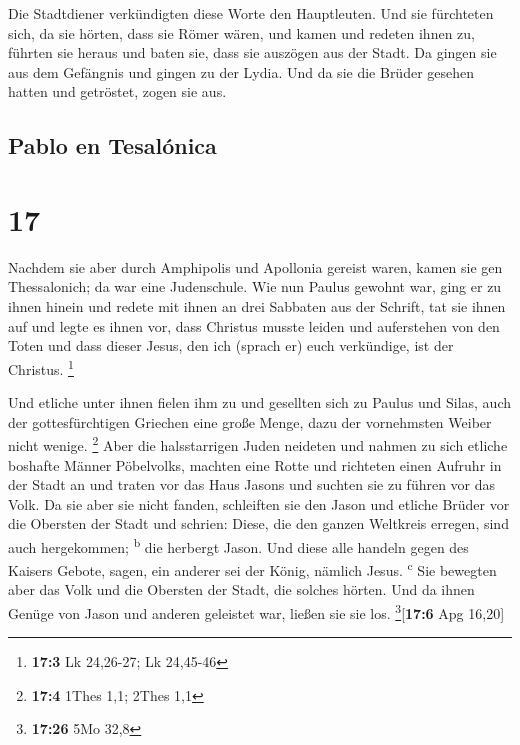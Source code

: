  Die Stadtdiener verkündigten diese Worte den
Hauptleuten. Und sie fürchteten sich, da sie hörten, dass sie Römer
wären,  und kamen und redeten ihnen zu, führten sie
heraus und baten sie, dass sie auszögen aus der Stadt. 
Da gingen sie aus dem Gefängnis und gingen zu der Lydia. Und da sie die
Brüder gesehen hatten und getröstet, zogen sie aus.

\hypertarget{pablo-en-tesaluxf3nica}{%
\subsection{Pablo en Tesalónica}\label{pablo-en-tesaluxf3nica}}

\hypertarget{section-16}{%
\section{17}\label{section-16}}

 Nachdem sie aber durch Amphipolis und Apollonia gereist
waren, kamen sie gen Thessalonich; da war eine Judenschule.
 Wie nun Paulus gewohnt war, ging er zu ihnen hinein und
redete mit ihnen an drei Sabbaten aus der Schrift,  tat
sie ihnen auf und legte es ihnen vor, dass Christus musste leiden und
auferstehen von den Toten und dass dieser Jesus, den ich (sprach er)
euch verkündige, ist der Christus. \footnote{\textbf{17:3} Lk 24,26-27;
  Lk 24,45-46}

 Und etliche unter ihnen fielen ihm zu und gesellten sich
zu Paulus und Silas, auch der gottesfürchtigen Griechen eine große
Menge, dazu der vornehmsten Weiber nicht wenige. \footnote{\textbf{17:4}
  1Thes 1,1; 2Thes 1,1}  Aber die halsstarrigen Juden
neideten und nahmen zu sich etliche boshafte Männer Pöbelvolks, machten
eine Rotte und richteten einen Aufruhr in der Stadt an und traten vor
das Haus Jasons und suchten sie zu führen vor das Volk. 
Da sie aber sie nicht fanden, schleiften sie den Jason und etliche
Brüder vor die Obersten der Stadt und schrien: Diese, die den ganzen
Weltkreis erregen, sind auch hergekommen; \textsuperscript{b}
 die herbergt Jason. Und diese alle handeln gegen des
Kaisers Gebote, sagen, ein anderer sei der König, nämlich Jesus.
\textsuperscript{c}  Sie bewegten aber das Volk und die
Obersten der Stadt, die solches hörten.  Und da ihnen
Genüge von Jason und anderen geleistet war, ließen sie sie los.
\footnote{\textbf{17:26} 5Mo 32,8}{[}\textbf{17:6} Apg 16,20{]}

